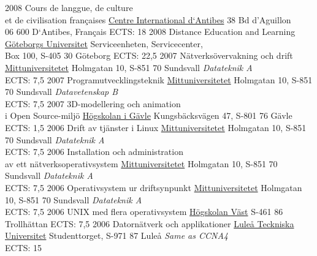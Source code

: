\documentclass[a4paper]{twentysecondcv} %
\begin{document}
\begin{twenty} %
	\twentyitem
		{2008}
        {Cours de langgue, de culture \\ et de civilisation françaises}
        {\href{http://www.cia-france.com/}{Centre International d`Antibes}}
        {38 Bd d'Aguillon \\ 06 600 D`Antibes, Français}
        {ECTS: 18}
	\twentyitem
     	{2008}
        {Distance Education and Learning}
        {\href{http://www.gu.se}{Göteborgs Universitet}}
        {Serviceenheten, Servicecenter, \\ Box 100, S-405 30 Göteborg}
        {ECTS: 22,5}
	\twentyitem
      	{2007}
        {Nätverksövervakning och drift}
        {\href{https://www.miun.se/}{Mittuniversitetet}}
        {Holmgatan 10, S-851 70 Sundsvall}
        {\textit{Datateknik A} \\ ECTS: 7,5}
	\twentyitem
      	{2007}
        {Programutvecklingsteknik}
        {\href{https://www.miun.se/}{Mittuniversitetet}}
        {Holmgatan 10, S-851 70 Sundsvall}
        {\textit{Datavetenskap B} \\ ECTS: 7,5}
	\twentyitem
      	{2007}
        {3D-modellering och animation \\ i Open Source-miljö}
        {\href{http://www.hig.se}{Högskolan i Gävle}}
        {Kungsbäcksvägen 47, S-801 76 Gävle}
        {ECTS: 1,5}
	\twentyitem
      	{2006}
        {Drift av tjänster i Linux}
        {\href{https://www.miun.se/}{Mittuniversitetet}}
        {Holmgatan 10, S-851 70 Sundsvall}
        {\textit{Datateknik A} \\ ECTS: 7,5}
	\twentyitem
      	{2006}
        {Installation och administration \\ av ett nätverksoperativsystem}
        {\href{https://www.miun.se/}{Mittuniversitetet}}
        {Holmgatan 10, S-851 70 Sundsvall}
        {\textit{Datateknik A} \\ ECTS: 7,5}          
	\twentyitem
      	{2006}
        {Operativsystem ur driftsynpunkt}
        {\href{https://www.miun.se/}{Mittuniversitetet}}
        {Holmgatan 10, S-851 70 Sundsvall}
        {\textit{Datateknik A} \\ ECTS: 7,5} 
	\twentyitem
    	{2006}
        {UNIX med flera operativsystem}
        {\href{https://www.hv.se/}{Högskolan Väst}}
        {S-461 86 Trollhättan}
        {ECTS: 7,5}
	\twentyitem
    	{2006}
    	{Datornätverk och applikationer}
        {\href{https://www.ltu.se}{Luleå Teckniska Universitet}}
        {Studenttorget, S-971 87 Luleå}
        {\textit{Same as CCNA4} \\ ECTS: 15}

\end{twenty} %
\end{document}
